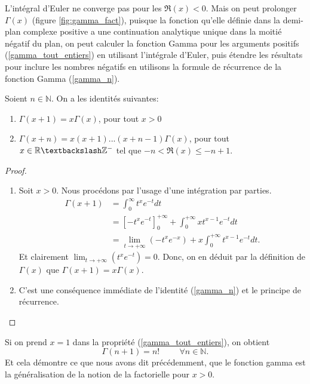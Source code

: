 L'intégral d'Euler ne converge pas pour les 
$\Re(x)<0$. Mais on peut prolonger $\Gamma(x)$ (figure \ref{fig:gamma_fact}), puisque la fonction qu'elle définie dans la demi-plan complexe positive a une continuation analytique unique dans la moitié négatif du plan, on peut calculer la fonction Gamma pour les arguments positifs (\ref{gamma_tout_entiers}) en utilisant l'intégrale d'Euler, puis étendre les résultats pour inclure les nombres négatifs en utilisons la formule de récurrence de la fonction Gamma (\ref{gamma_n}).
\begin{proposition}
    Soient $n\in \mathbb{N}$. On a les identités suivantes:
        \begin{enumerate}
            \item $\Gamma(x+1) = x\Gamma(x)$, pour tout $x > 0$\label{gamma_n}
            \item $\Gamma(x+n) = x(x+1) ... (x+n-1)\Gamma(x)$, \label{gamma_tout_entiers} pour tout $x\in \mathbb{R \textbackslash Z^-}$ tel que $ -n < \Re(x) \leq -n+1 $.
        \end{enumerate}
    
\end{proposition}
\begin{proof}
    \begin{enumerate}
        \item Soit $x>0$. Nous procédons par l'usage d'une intégration par parties.\\
        \begin{align*}
            \Gamma(x+1) &= \int_{0}^{\infty} t^x e^{-t} dt \\
            &= \left[ -t^x e^{-t} \right]_0^{+\infty} + \int_{0}^{+\infty} xt^{x-1} e^{-t} dt\\ 
            &= \lim_{t \to +\infty} (-t^x e^{-x}) + x\int_{0}^{+\infty} t^{x-1}e^{-t} dt.
        \end{align*}
        Et clairement $\lim_{t \to +\infty} (t^x e^{-t}) = 0$. Donc, on en déduit par la définition de $\Gamma(x)$ que $\Gamma(x+1) = x\Gamma(x)$. \label{gamma_n}
        \item C'est une conséquence immédiate de l'identité (\ref{gamma_n}) et le principe de récurrence.
    \end{enumerate}
\end{proof}
\begin{remarque}
    Si on prend $x=1$ dans la propriété (\ref{gamma_tout_entiers}), on obtient
    \begin{equation*}
        \Gamma(n+1)=n! \hspace{1cm} \forall n \in \mathbb{N}.
    \end{equation*}
    Et cela démontre ce que nous avons dit précédemment, que le fonction gamma est la généralisation de la notion de la factorielle pour $x > 0$.
\end{remarque}
